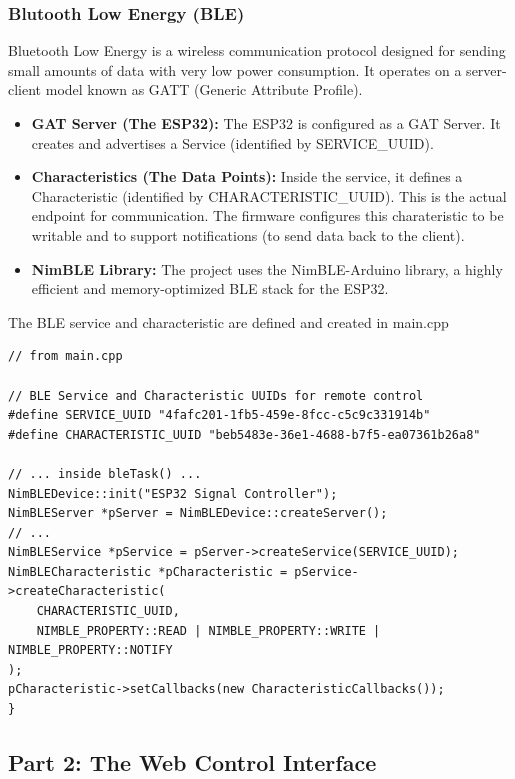 \subsubsection{Blutooth Low Energy (BLE)}
Bluetooth Low Energy is a wireless communication protocol designed for sending small amounts of data with very low power 
consumption. It operates on a server-client model known as GATT (Generic Attribute Profile).

\begin{itemize}
    \item \textbf{GAT Server (The ESP32):} The ESP32 is configured as a GAT Server. It creates and advertises a Service
        (identified by SERVICE\_UUID).
    \item \textbf{Characteristics (The Data Points):} Inside the service, it defines a Characteristic (identified by 
        CHARACTERISTIC\_UUID). This is the actual endpoint for communication. The firmware configures this charateristic to
        be writable and to support notifications (to send data back to the client).
    \item \textbf{NimBLE Library:} The project uses the NimBLE-Arduino library, a highly efficient and memory-optimized
        BLE stack for the ESP32.
\end{itemize}

The BLE service and characteristic are defined and created in main.cpp


\begin{lstlisting}[caption={BLE service}]
// from main.cpp

// BLE Service and Characteristic UUIDs for remote control
#define SERVICE_UUID "4fafc201-1fb5-459e-8fcc-c5c9c331914b"
#define CHARACTERISTIC_UUID "beb5483e-36e1-4688-b7f5-ea07361b26a8"

// ... inside bleTask() ...
NimBLEDevice::init("ESP32 Signal Controller");
NimBLEServer *pServer = NimBLEDevice::createServer();
// ...
NimBLEService *pService = pServer->createService(SERVICE_UUID);
NimBLECharacteristic *pCharacteristic = pService->createCharacteristic(
    CHARACTERISTIC_UUID,
    NIMBLE_PROPERTY::READ | NIMBLE_PROPERTY::WRITE | NIMBLE_PROPERTY::NOTIFY
);
pCharacteristic->setCallbacks(new CharacteristicCallbacks());
}
\end{lstlisting}

\subsection{Part 2: The Web Control Interface}

